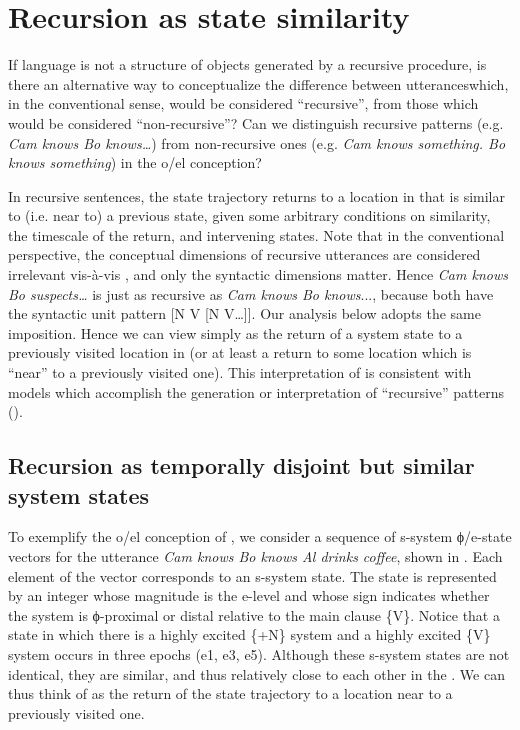 \section{Recursion as state similarity}

If language is not a structure of objects generated by a recursive procedure, is there an alternative way to conceptualize the difference between utterances\linebreak which, in the conventional sense, would be considered “recursive”, from those which would be considered “non-recursive”? Can we distinguish recursive patterns (e.g. \textit{Cam knows Bo knows…}) from non-recursive ones (e.g. \textit{Cam knows something. Bo knows something}) in the o/el conception? 

  In recursive sentences, the state trajectory returns to a location in  that is similar to (i.e. near to) a previous state, given some arbitrary conditions on similarity, the timescale of the return, and intervening states. Note that in the conventional perspective, the conceptual dimensions of recursive utterances are considered irrelevant vis-à-vis , and only the syntactic dimensions matter. Hence \textit{Cam knows Bo suspects…} is just as recursive as \textit{Cam knows Bo knows}..., because both have the syntactic unit pattern [N V [N V…]]. Our analysis below adopts the same imposition. Hence we can view  simply as the return of a system state to a previously visited location in  (or at least a return to some location which is “near” to a previously visited one). This interpretation of  is consistent with  models which accomplish the generation or interpretation of “recursive” patterns (\citealt{ChristiansenChater1999,Elman1989,Smolensky1990}).

\subsection{Recursion as temporally disjoint but similar system states}

To exemplify the o/el conception of , we consider a sequence of s-sys\-tem ϕ/e-state vectors for the utterance \textit{Cam knows Bo knows Al drinks coffee}, shown in {}. Each element of the vector corresponds to an s-sys\-tem state. The state is represented by an integer whose magnitude is the e-level and whose sign indicates whether the system is ϕ-proximal or distal relative to the main clause \{V\}. Notice that a state in which there is a highly excited \{+N\} system and a highly excited \{V\} system occurs in three epochs (e1, e3, e5). Although these s-sys\-tem states are not identical, they are similar, and thus relatively close to each other in the . We can thus think of  as the return of the state trajectory to a  location near to a previously visited one.

